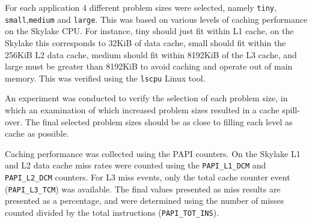 \documentclass[../document.tex]{subfiles}
\begin{document}
\label{ssec:setting_sizes}

For each application 4 different problem sizes were selected, namely {\tt tiny}, {\tt small},{\tt medium} and {\tt large}.
This was based on various levels of caching performance on the Skylake CPU.
For instance, tiny should just fit within L1 cache, on the Skylake this corresponds to 32KiB of data cache, small should fit within the 256KiB L2 data cache, medium should fit within 8192KiB of the L3 cache, and large must be greater than 8192KiB to avoid caching and operate out of main memory.
This was verified using the {\tt lscpu} Linux tool.

An experiment was conducted to verify the selection of each problem size, in which an examination of which increased problem sizes resulted in a cache spill-over.
The final selected problem sizes should be as close to filling each level as cache as possible.

Caching performance was collected using the PAPI counters.
On the Skylake L1 and L2 data cache miss rates were counted using the {\tt PAPI\_L1\_DCM} and {\tt PAPI\_L2\_DCM} counters.
For L3 miss events, only the total cache counter event ({\tt PAPI\_L3\_TCM}) was available.
The final values presented as miss results are presented as a percentage, and were determined using the number of misses counted divided by the total instructions ({\tt PAPI_TOT_INS}).
\end{document}
